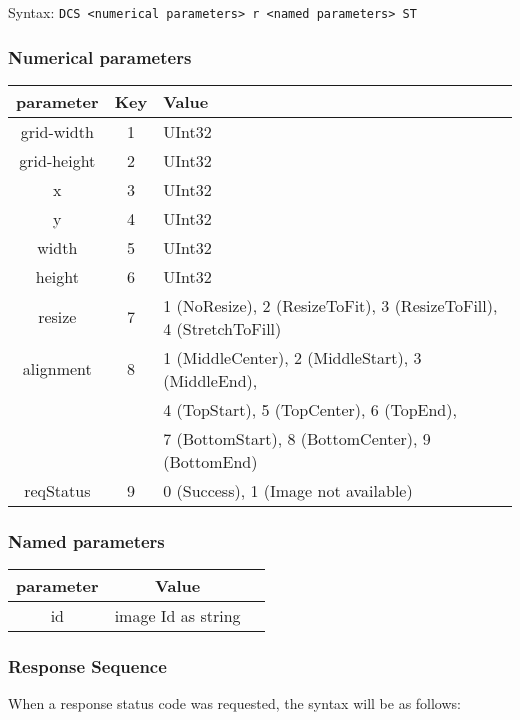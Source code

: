 \documentclass{article}
\newcommand{\code}[1]{\colorbox{light-gray}{\texttt{#1}}}
\begin{document}
Syntax: \code{DCS <numerical parameters> r <named parameters> ST}

\subsubsection*{Numerical parameters}

\begin{tabular}{ |c|c|l| }
    \hline
    \textbf{parameter}   & \textbf{Key} & \textbf{Value} \\
    \hline
    grid-width  & 1   & UInt32 \\
    grid-height & 2   & UInt32 \\
    x           & 3   & UInt32 \\
    y           & 4   & UInt32 \\
    width       & 5   & UInt32 \\
    height      & 6   & UInt32 \\
    resize      & 7   & 1 (NoResize), 2 (ResizeToFit), 3 (ResizeToFill), 4 (StretchToFill) \\
    alignment   & 8   & 1 (MiddleCenter), 2 (MiddleStart), 3 (MiddleEnd), \\
                &     & 4 (TopStart), 5 (TopCenter), 6 (TopEnd), \\
                &     & 7 (BottomStart), 8 (BottomCenter), 9 (BottomEnd) \\
    reqStatus   & 9   & 0 (Success), 1 (Image not available) \\
    \hline
\end{tabular}

\subsubsection*{Named parameters}

\begin{tabular}{ |c|c|l| }
    \hline
    \textbf{parameter}   & \textbf{Value} \\
    \hline
    id          & image Id as string \\
    \hline
\end{tabular}

\subsubsection*{Response Sequence}

When a response status code was requested, the syntax will be as follows:
\end{document}
